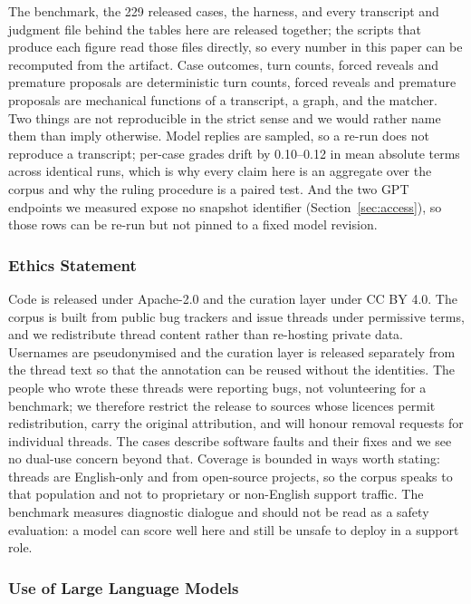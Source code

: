 \documentclass{article} %
\begin{document}
The benchmark, the 229 released cases, the harness, and every transcript
and judgment file behind the tables here are released together; the
scripts that produce each figure read those files directly, so every
number in this paper can be recomputed from the artifact. Case outcomes,
turn counts, forced reveals and premature proposals are deterministic
turn counts, forced reveals and premature proposals are mechanical functions of a transcript, a graph, and the matcher. Two things are
not reproducible in the strict sense and we would rather name them than
imply otherwise. Model replies are sampled, so a re-run does not
reproduce a transcript; per-case grades drift by 0.10--0.12 in mean
absolute terms across identical runs, which is why every claim here is an
aggregate over the corpus and why the ruling procedure is a paired test.
And the two GPT endpoints we measured expose no snapshot identifier
(Section~\ref{sec:access}), so those rows can be re-run but not pinned to
a fixed model revision.

\subsubsection*{Ethics Statement}

Code is released under Apache-2.0 and the curation layer under CC BY 4.0.
The corpus is built from public bug trackers and issue threads under
permissive terms, and we redistribute thread content rather than
re-hosting private data. Usernames are pseudonymised and the curation
layer is released separately from the thread text so that the annotation
can be reused without the identities. The people who wrote these threads
were reporting bugs, not volunteering for a benchmark; we therefore
restrict the release to sources whose licences permit redistribution,
carry the original attribution, and will honour removal requests for
individual threads. The cases describe software faults and their fixes
and we see no dual-use concern beyond that. Coverage is bounded in ways
worth stating: threads are English-only and from open-source projects, so
the corpus speaks to that population and not to proprietary or
non-English support traffic. The benchmark measures
diagnostic dialogue and should not be read as a safety evaluation: a
model can score well here and still be unsafe to deploy in a support
role.

\subsubsection*{Use of Large Language Models}
\end{document}

